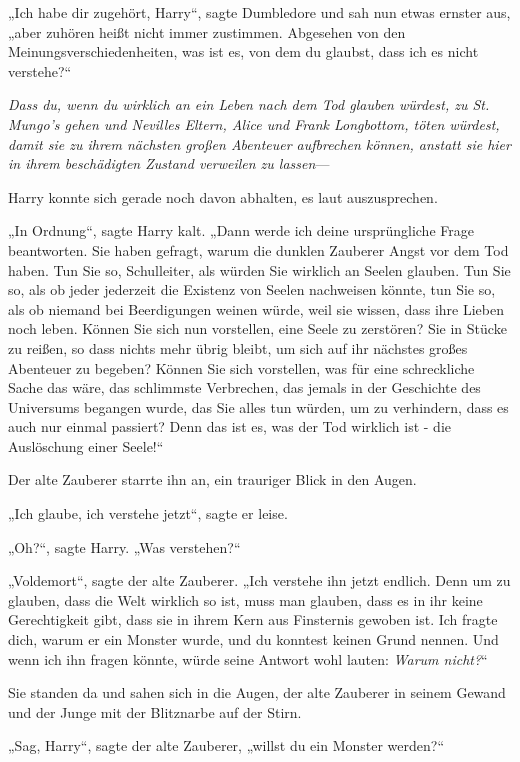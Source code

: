 {„Ich habe dir zugehört, Harry“, sagte Dumbledore und sah nun etwas ernster aus, „aber zuhören heißt nicht immer zustimmen. Abgesehen von den Meinungsverschiedenheiten, was ist es, von dem du glaubst, dass ich es nicht verstehe?“

\emph{Dass du, wenn du wirklich an ein Leben nach dem Tod glauben würdest, zu St. Mungo's gehen und Nevilles Eltern, Alice und Frank Longbottom, töten würdest, damit sie zu ihrem nächsten großen Abenteuer aufbrechen können, anstatt sie hier in ihrem beschädigten Zustand verweilen zu lassen}—

Harry konnte sich gerade noch davon abhalten, es laut auszusprechen.

„In Ordnung“, sagte Harry kalt. „Dann werde ich deine ursprüngliche Frage beantworten. Sie haben gefragt, warum die dunklen Zauberer Angst vor dem Tod haben. Tun Sie so, Schulleiter, als würden Sie wirklich an Seelen glauben. Tun Sie so, als ob jeder jederzeit die Existenz von Seelen nachweisen könnte, tun Sie so, als ob niemand bei Beerdigungen weinen würde, weil sie wissen, dass ihre Lieben noch leben. Können Sie sich nun vorstellen, eine Seele zu zerstören? Sie in Stücke zu reißen, so dass nichts mehr übrig bleibt, um sich auf ihr nächstes großes Abenteuer zu begeben? Können Sie sich vorstellen, was für eine schreckliche Sache das wäre, das schlimmste Verbrechen, das jemals in der Geschichte des Universums begangen wurde, das Sie alles tun würden, um zu verhindern, dass es auch nur einmal passiert? Denn das ist es, was der Tod wirklich ist - die Auslöschung einer Seele!“

Der alte Zauberer starrte ihn an, ein trauriger Blick in den Augen.

„Ich glaube, ich verstehe jetzt“, sagte er leise.

„Oh?“, sagte Harry. „Was verstehen?“

„Voldemort“, sagte der alte Zauberer. „Ich verstehe ihn jetzt endlich. Denn um zu glauben, dass die Welt wirklich so ist, muss man glauben, dass es in ihr keine Gerechtigkeit gibt, dass sie in ihrem Kern aus Finsternis gewoben ist. Ich fragte dich, warum er ein Monster wurde, und du konntest keinen Grund nennen. Und wenn ich ihn fragen könnte, würde seine Antwort wohl lauten: \emph{Warum nicht?}“

Sie standen da und sahen sich in die Augen, der alte Zauberer in seinem Gewand und der Junge mit der Blitznarbe auf der Stirn.

„Sag, Harry“, sagte der alte Zauberer, „willst du ein Monster werden?“

}
